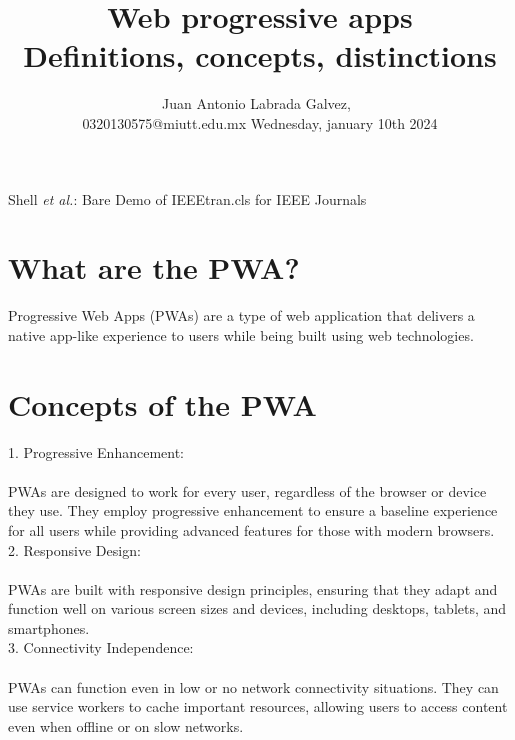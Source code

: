 \documentclass[journal]{IEEEtran}
\begin{document}
%
\title{Web progressive apps\\ Definitions, concepts, distinctions}

\author{Juan Antonio Labrada Galvez,~
        
0320130575@miutt.edu.mx Wednesday, january 10th 2024}%
        
%
{Shell \MakeLowercase{\textit{et al.}}: Bare Demo of IEEEtran.cls for IEEE Journals}

\maketitle

\section{What are the PWA?}

Progressive Web Apps (PWAs) are a type of web application that delivers a native app-like experience to users while being built using web technologies.

\section{Concepts of the PWA}

1. Progressive Enhancement:\\
   \\PWAs are designed to work for every user, regardless of the browser or device they use. They employ progressive enhancement to ensure a baseline experience for all users while providing advanced features for those with modern browsers.\\

2. Responsive Design:\\
   \\PWAs are built with responsive design principles, ensuring that they adapt and function well on various screen sizes and devices, including desktops, tablets, and smartphones.\\

3. Connectivity Independence:\\
   \\PWAs can function even in low or no network connectivity situations. They can use service workers to cache important resources, allowing users to access content even when offline or on slow networks.\\
\end{document}
